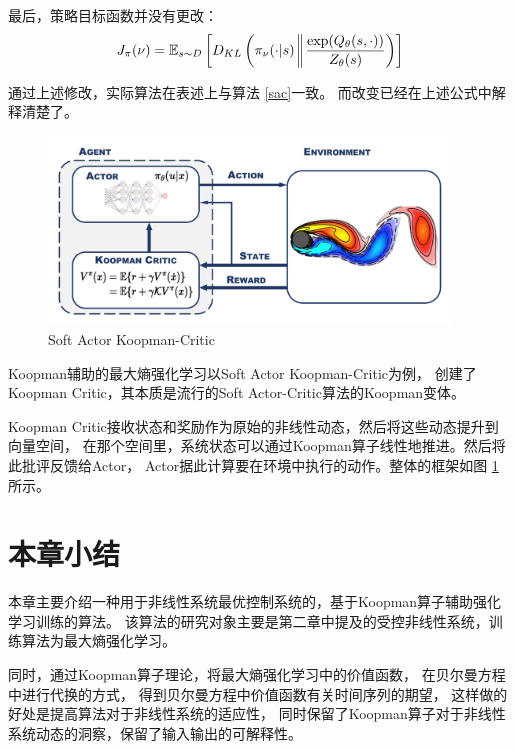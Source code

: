 \documentclass[AutoFakeBold]{LZUThesis}
\begin{document}
最后，策略目标函数并没有更改：
\begin{equation}
  J_\pi(\nu) = \mathbb{E}_{s \sim D}
  \left[ D_{KL}\left( \pi_{\nu}(\cdot | s)
  \bigg\Arrowvert
  \frac{\exp(Q_\theta(s, \cdot))}
  {Z_\theta(s)} \right) \right]
\end{equation}

通过上述修改，实际算法在表述上与算法 \ref{sac}一致。
而改变已经在上述公式中解释清楚了。

\begin{figure}[H]
  \centering
    \includegraphics[width=0.95\textwidth]{figures/sakc.pdf}
  \caption{Soft Actor Koopman-Critic}
  \label{fig_sakc}
\end{figure}

Koopman辅助的最大熵强化学习以Soft Actor Koopman-Critic为例，
创建了Koopman Critic，其本质是流行的Soft Actor-Critic算法的Koopman变体。

Koopman Critic接收状态和奖励作为原始的非线性动态，然后将这些动态提升到向量空间，
在那个空间里，系统状态可以通过Koopman算子线性地推进。然后将此批评反馈给Actor，
Actor据此计算要在环境中执行的动作。整体的框架如图 \ref{fig_sakc}所示。


\section{本章小结}
本章主要介绍一种用于非线性系统最优控制系统的，基于Koopman算子辅助强化学习训练的算法。
该算法的研究对象主要是第二章中提及的受控非线性系统，训练算法为最大熵强化学习。

同时，通过Koopman算子理论，将最大熵强化学习中的价值函数，
在贝尔曼方程中进行代换的方式，
得到贝尔曼方程中价值函数有关时间序列的期望，
这样做的好处是提高算法对于非线性系统的适应性，
同时保留了Koopman算子对于非线性系统动态的洞察，保留了输入输出的可解释性。
\end{document}
